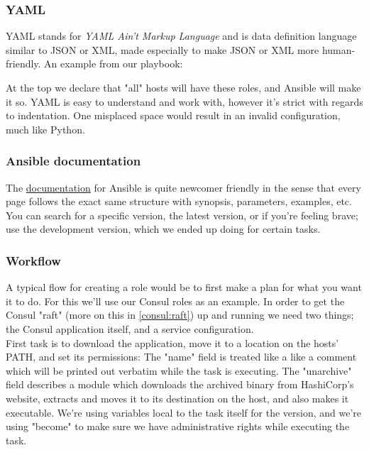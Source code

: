            \subsubsection{YAML}
                YAML stands for \textit{YAML Ain't Markup Language} and is data definition language similar to JSON or XML, made especially to make JSON or XML more human-friendly. An example from our playbook:
                
    
                At the top we declare that "all" hosts will have these roles, and Ansible will make it so. YAML is easy to understand and work with, however it's strict with regards to indentation. One misplaced space would result in an invalid configuration, much like Python.
            
            \subsubsection{Ansible documentation}
                The \href{https://docs.ansible.com/ansible/latest/user_guide/index.html}{documentation} for Ansible is quite newcomer friendly in the sense that every page follows the exact same structure with synopsis, parameters, examples, etc. You can search for a specific version, the latest version, or if you're feeling brave; use the development version, which we ended up doing for certain tasks.
            
            \subsubsection{Workflow} \label{ansible:workflow}
                A typical flow for creating a role would be to first make a plan for what you want it to do. For this we'll use our Consul roles as an example. In order to get the Consul "raft" (more on this in \ref{consul:raft}) up and running we need two things; the Consul application itself, and a service configuration.\\
                
                First task is to download the application, move it to a location on the hosts' PATH, and set its permissions:
                The "name" field is treated like a like a comment which will be printed out verbatim while the task is executing. The "unarchive" field describes a module which downloads the archived binary from HashiCorp's website, extracts and moves it to its destination on the host, and also makes it executable. We're using variables local to the task itself for the version, and we're using "become" to make sure we have administrative rights while executing the task. \\
                
